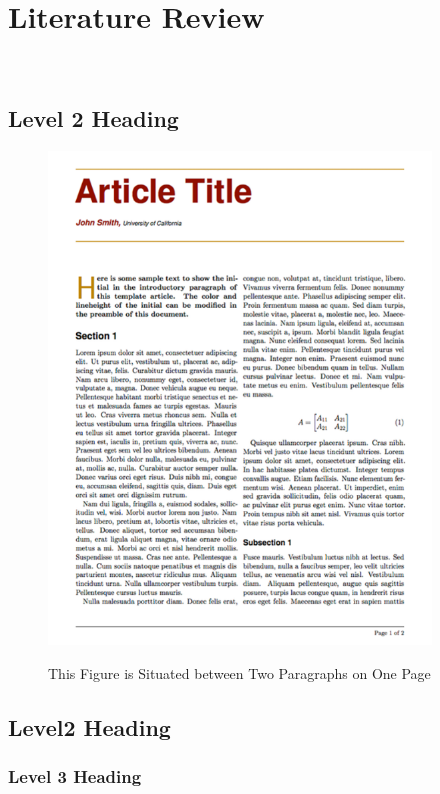 
\chapter{Literature Review}
\lipsum[14]\\

\lipsum[23]

\section{Level 2 Heading}

\lipsum[13]

\vspace{2\baselineskip}
\begin{figure}[htb!]
    \caption{This Figure is Situated between Two Paragraphs on One Page}
    
    \includegraphics[width = 4in]{Figures/article.png}
    \label{fig:article}
\end{figure}
\FloatBarrier
\vspace{\baselineskip}

\lipsum[23]

\section{Level2 Heading}
\subsection{Level 3 Heading}

